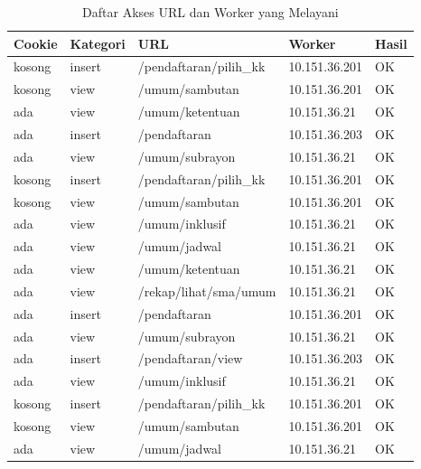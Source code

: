 \documentclass{ta-its}
\begin{document}
					\begin{longtable}{|p{0.13\textwidth}|p{}|p{}|p{}|p{}|} %
						
						\caption{Daftar Akses URL dan Worker yang Melayani} \label{tabelBagiBeban} \\
						\hline
						\textbf{Cookie} & \textbf{Kategori} & \textbf{URL} & \textbf{Worker} & \textbf{Hasil}\\ \hline
						
						\endhead
						\endfoot
						\endlastfoot
						
						kosong & insert & /pendaftaran/pilih\_kk & 10.151.36.201 & OK\\ \hline
						kosong & view & /umum/sambutan & 10.151.36.201 & OK\\ \hline
						ada & view & /umum/ketentuan & 10.151.36.21 & OK\\ \hline
						ada & insert & /pendaftaran & 10.151.36.203 & OK\\ \hline
						ada & view & /umum/subrayon & 10.151.36.21 & OK\\ \hline
						kosong & insert & /pendaftaran/pilih\_kk & 10.151.36.201 & OK\\ \hline
						kosong & view & /umum/sambutan & 10.151.36.201 & OK\\ \hline
						ada & view & /umum/inklusif & 10.151.36.21 & OK\\ \hline
						ada & view & /umum/jadwal & 10.151.36.21 & OK\\ \hline
						ada & view & /umum/ketentuan & 10.151.36.21 & OK\\ \hline
						ada & view & /rekap/lihat/sma/umum & 10.151.36.21 & OK\\ \hline
						ada & insert & /pendaftaran & 10.151.36.201 & OK\\ \hline
						ada & view & /umum/subrayon & 10.151.36.21 & OK\\ \hline
						ada & insert & /pendaftaran/view & 10.151.36.203 & OK\\ \hline
						ada & view & /umum/inklusif & 10.151.36.21 & OK\\ \hline
						kosong & insert & /pendaftaran/pilih\_kk & 10.151.36.201 & OK\\ \hline
						kosong & view & /umum/sambutan & 10.151.36.201 & OK\\ \hline
						ada & view & /umum/jadwal & 10.151.36.21 & OK\\ \hline

\end{longtable}
\end{document}
